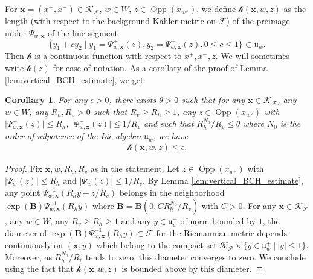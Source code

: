 \documentclass[12pt]{amsbook}%
\newtheorem{cor}[thm]{Corollary}
\theoremstyle{definition}
\theoremstyle{remark}
\numberwithin{section}{chapter}
\numberwithin{subsection}{section}
\numberwithin{figure}{chapter}
\DeclareMathOperator{\Opp}{Opp}
\def\dyl{>0}
\def\cF{{\mathscr{F}}}
\def\sK{{\mathscr{K}}}
\def\fu{{\mathfrak{u}}}
\def\xpair{{(x^+,x^-)}}
\def\cah{{\mathcal{h}}}
\def\bx{\mathbf{x}}
\begin{document}
{{For $\bx=\xpair\in \mathscr{K}_\cF$, $w\in W$, $z\in \Opp(x_{w^\vee})$, we define $\cah(\bx,w,z)$ as the length (with respect to the background K\"ahler metric on $\cF$) of the preimage under $\Psi_{w,\bx}$ of the line segment 
\[
\{y_1+cy_2 \mid y_1=\Psi_{w,\bx}^+(z), y_2=\Psi_{w,\bx}^-(z), 0\leqslant c \leqslant 1\}\subset \fu_w.
\]
Then $\cah$ is a continuous function with respect to $x^+,x^-,z$. We will sometimes write $\cah(z)$ for ease of notation. As a corollary of the proof of Lemma \ref{lem:vertical_BCH_estimate}, we get
\begin{cor}\label{cor:pizza_BCH}
For any $\epsilon>0$, there exists $\theta > 0$ such that 
for any $\bx\in \sK_\cF$, any $w\in W$, any $R_h,R_v\dyl$ such that $R_v\geqslant R_h\geqslant 1$, any $z\in  \Opp(x_{w^\vee})$ with $\vert \Psi_{w,\bx}^+(z) \vert \leqslant R_h$, $\vert \Psi_{w,\bx}^-(z)\vert \leqslant 1/R_v$ and such that $R_h^{N_0}/R_v\leqslant \theta$ where $N_0$ is the order of nilpotence of the Lie algebra $\fu_w$, we have 
\begin{align*}
\cah(\bx,w,z)\leqslant \epsilon.
\end{align*}
\end{cor}
\begin{proof}
Fix $\bx,w,R_h,R_v$ as in the statement. Let $z\in  \Opp(x_{w^\vee})$ with $\vert \Psi_w^+(z) \vert \leqslant R_h$ and $\vert \Psi_w^-(z)\vert \leqslant 1/R_v$. 
By Lemma \ref{lem:vertical_BCH_estimate}, any point $\Psi_{w,\bx}^{-1} (R_h y + z/R_v)$ belongs in the neighborhood $\exp(\mathbf{B}) \Psi_{w,\bx}^{-1}(R_h y)$ where $\mathbf{B} = \mathbf{B}(0, C R_h^{N_0}/R_v)$ with $C>0$.  
For any $\bx \in \sK_{\cF}$, any $w \in W$, any $R_v \geqslant R_h \geqslant 1$ and any $y \in \mathfrak{u}_{w}^+$ of norm bounded by $1$, the diameter of $\exp(\mathbf{B}) \Psi_{w,\bx}^{-1}(R_h y) \subset \cF$ for the Riemannian metric depends continuously on $(\bx,y)$ which belong to the compact set $ \sK_{\cF} \times  \{ y \in \mathfrak{u}_{w}^+ \ | \ |y|\leqslant 1 \}$. Moreover, as $R_h^{N_0}/R_v$ tends to zero, this diameter converges to zero. We conclude using the fact that $\cah(\bx, w, z)$ is bounded above by this diameter. 

\end{proof}}}
\end{document}
